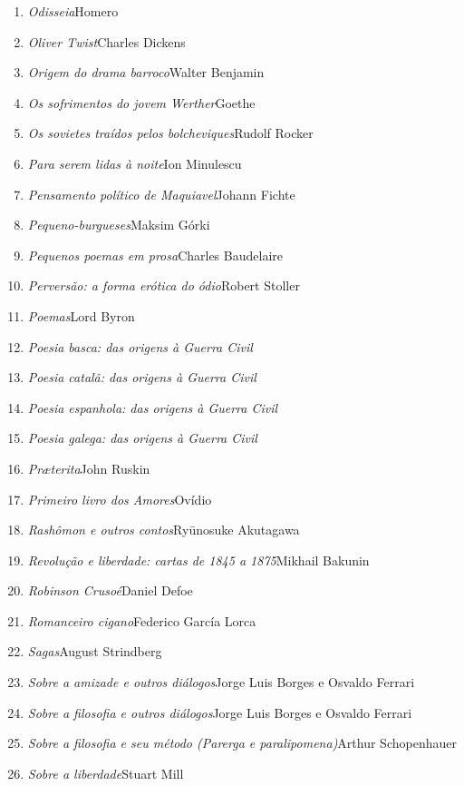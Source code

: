 \begin{enumerate}
\item \textit{Odisseia}\quad Homero
\item \textit{Oliver Twist}\quad Charles Dickens
\item \textit{Origem do drama barroco}\quad Walter Benjamin
\item \textit{Os sofrimentos do jovem Werther}\quad Goethe
\item \textit{Os sovietes traídos pelos bolcheviques}\quad Rudolf Rocker
\item \textit{Para serem lidas à noite}\quad Ion Minulescu
\item \textit{Pensamento político de Maquiavel}\quad Johann Fichte
\item \textit{Pequeno-burgueses}\quad Maksim Górki
\item \textit{Pequenos poemas em prosa}\quad Charles Baudelaire
\item \textit{Perversão: a forma erótica do ódio}\quad Robert Stoller
\item \textit{Poemas}\quad Lord Byron
\item \textit{Poesia basca: das origens à Guerra Civil} 
\item \textit{Poesia catalã: das origens à Guerra Civil} 
\item \textit{Poesia espanhola: das origens à Guerra Civil} 
\item \textit{Poesia galega: das origens à Guerra Civil} 
\item \textit{Pr\ae terita}\quad John Ruskin
\item \textit{Primeiro livro dos Amores}\quad Ovídio
\item \textit{Rashômon e outros contos}\quad Ryūnosuke Akutagawa
\item \textit{Revolução e liberdade: cartas de 1845 a 1875}\quad Mikhail Bakunin
\item \textit{Robinson Crusoé}\quad Daniel Defoe
\item \textit{Romanceiro cigano}\quad Federico García Lorca
\item \textit{Sagas}\quad August Strindberg
\item \textit{Sobre a amizade e outros diálogos}\quad Jorge Luis Borges e Osvaldo Ferrari
\item \textit{Sobre a filosofia e outros diálogos}\quad Jorge Luis Borges e Osvaldo Ferrari
\item \textit{Sobre a filosofia e seu método (Parerga e paralipomena)}\quad Arthur Schopenhauer 
\item \textit{Sobre a liberdade}\quad Stuart Mill

\end{enumerate}
